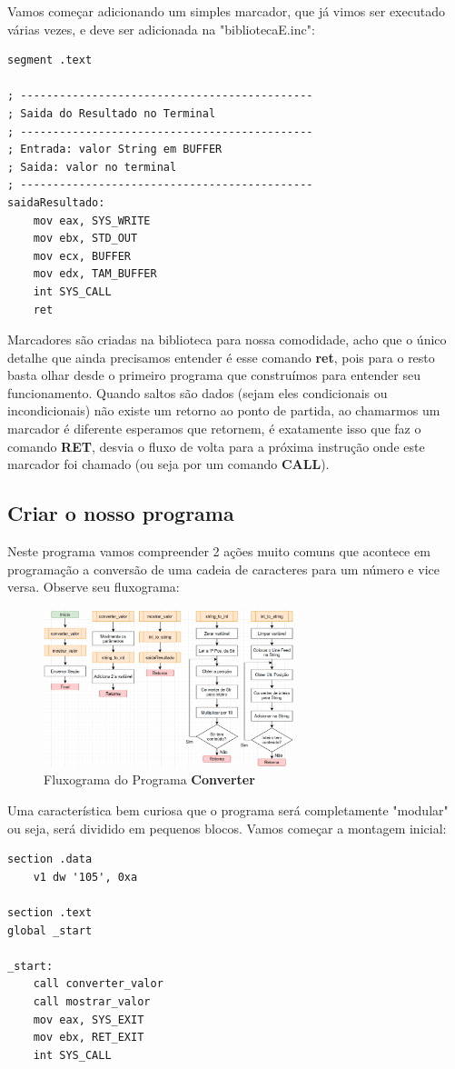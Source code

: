Vamos começar adicionando um simples marcador, que já vimos ser executado várias vezes, e deve ser adicionada na "bibliotecaE.inc":

\begin{lstlisting}[]
segment .text

; ---------------------------------------------
; Saida do Resultado no Terminal
; ---------------------------------------------
; Entrada: valor String em BUFFER
; Saida: valor no terminal
; ---------------------------------------------
saidaResultado:
	mov eax, SYS_WRITE
	mov ebx, STD_OUT
	mov ecx, BUFFER
	mov edx, TAM_BUFFER
	int SYS_CALL
	ret
\end{lstlisting}

Marcadores são criadas na biblioteca para nossa comodidade, acho que o único detalhe que ainda precisamos entender é esse comando \textbf{ret}, pois para o resto basta olhar desde o primeiro programa que construímos para entender seu funcionamento. Quando saltos são dados (sejam eles condicionais ou incondicionais) não existe um retorno ao ponto de partida, ao chamarmos um marcador é diferente esperamos que retornem, é exatamente isso que faz o comando \textbf{RET}, desvia o fluxo de volta para a próxima instrução onde este marcador foi chamado (ou seja por um comando \textbf{CALL}).

\subsection{Criar o nosso programa}
Neste programa vamos compreender 2 ações muito comuns que acontece em programação a conversão de uma cadeia de caracteres para um número e vice versa. Observe seu fluxograma:
\begin{figure}[H]
	\centering
	\includegraphics[width=0.65\textwidth]{Pictures/cap01/programa14}
	\caption{Fluxograma do Programa \textbf{Converter}}
\end{figure}

Uma característica bem curiosa que o programa será completamente "modular" ou seja, será dividido em pequenos blocos. Vamos começar a montagem inicial:
\begin{lstlisting}[]
section .data
	v1 dw '105', 0xa

section .text
global _start

_start:
	call converter_valor
	call mostrar_valor
	mov eax, SYS_EXIT
	mov ebx, RET_EXIT
	int SYS_CALL
\end{lstlisting}

